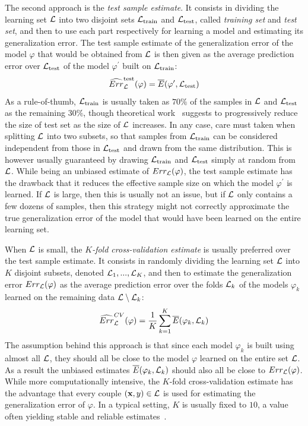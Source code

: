 The second approach is the \textit{test sample estimate}. It consists in
dividing the learning set ${\cal L}$ into two disjoint sets ${\cal
L}_\text{train}$ and ${\cal L}_\text{test}$, called \textit{training set} and
\textit{test set}, and then to use each part respectively for learning a model
and estimating its generalization error. The test sample estimate of the
generalization error of the model $\varphi$ that would be obtained from ${\cal
L}$ is then given as the average prediction error over ${\cal L}_\text{test}$
of the model $\varphi^\prime$ built on ${\cal L}_\text{train}$:
\begin{equation}\label{eqn:test-error}
\widehat{Err}_{\cal L}^\text{test}(\varphi) = \overline{E}(\varphi^\prime, {\cal L}_\text{test})
\end{equation}
As a rule-of-thumb,
${\cal L}_\text{train}$ is usually taken as $70\%$ of the samples in
${\cal L}$ and ${\cal L}_\text{test}$ as the remaining $30\%$, though
theoretical work~\citep{guyon:1997} suggests to progressively reduce the size of test set as
the size of ${\cal L}$ increases. In any case, care must taken when splitting ${\cal
L}$ into two subsets, so that samples from ${\cal L}_\text{train}$ can be
considered independent from those in ${\cal L}_\text{test}$ and drawn from the
same distribution. This is however usually guaranteed by drawing ${\cal
L}_\text{train}$ and ${\cal L}_\text{test}$ simply at random from ${\cal L}$.
While being an unbiased estimate of $Err_{\cal L}(\varphi)$, the test sample
estimate has the drawback that it reduces the
effective sample size on which the model $\varphi^\prime$ is learned. If ${\cal L}$ is large,
then this is usually not an issue, but if ${\cal L}$ only contains a few dozens
of samples, then this strategy might not correctly approximate the true
generalization error of the model that would have been learned on the entire learning set.

When ${\cal L}$ is small, the \textit{$K$-fold cross-validation estimate} is
usually preferred over the test sample estimate. It consists in randomly
dividing the learning set ${\cal L}$ into $K$ disjoint subsets, denoted  ${\cal
L}_1, ..., {\cal L}_K$, and then to estimate the generalization error $Err_{\cal
L}(\varphi)$ as the average prediction error over the folds ${\cal L}_k$ of the
models $\varphi_k$  learned on the remaining data ${\cal L}\setminus{\cal
L}_k$:
\begin{equation}\label{eqn:cv-error}
\widehat{Err}_{\cal L}^{CV}(\varphi) = \frac{1}{K} \sum_{k=1}^K  \overline{E}(\varphi_k, {\cal L}_k)
\end{equation}
The assumption behind this approach is that since each model $\varphi_k$ is
built using almost all ${\cal L}$, they should all be close to the model
$\varphi$ learned on the entire set ${\cal L}$. As a result the unbiased
estimates $\overline{E}(\varphi_k, {\cal L}_k)$ should also all be close to
$Err_{\cal L}(\varphi)$. While more computationally intensive, the $K$-fold
cross-validation estimate has the advantage that every couple $(\mathbf{x}, y)
\in {\cal L}$ is used for estimating the generalization error of $\varphi$. In
a typical setting, $K$ is usually fixed to $10$, a value often yielding stable
and reliable estimates~\citep{kohavi:1995}.

